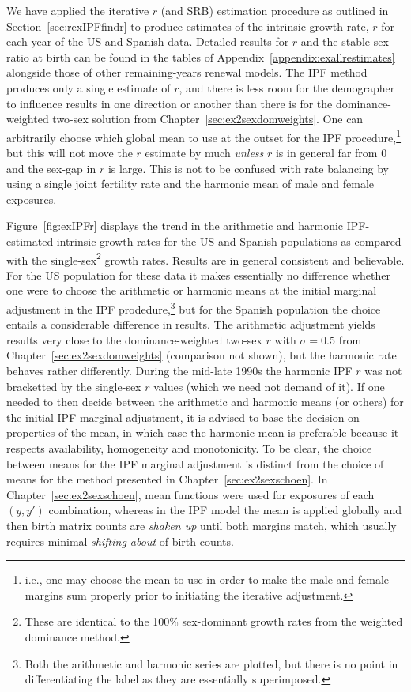 \FloatBarrier

We have applied the iterative $r$ (and SRB) estimation procedure as outlined in
Section~\ref{sec:rexIPFfindr} to produce estimates of the intrinsic growth rate,
$r$ for each year of the US and Spanish data. Detailed results for $r$ and
the stable sex ratio at birth can be found in the tables of
Appendix~\ref{appendix:exallrestimates} alongside those of other remaining-years 
renewal models. The IPF method produces only a single
estimate of $r$, and there is less room for the demographer to influence 
results in one direction or another than there is for the dominance-weighted 
two-sex solution from Chapter~\ref{sec:ex2sexdomweights}. One can
arbitrarily choose which global mean to use at the outset for the IPF
procedure,\footnote{i.e., one may choose the mean to use in order to make the
male and female margins sum properly prior to initiating the iterative adjustment.}
but this will not move the $r$ estimate by much \textit{unless} $r$ is in
general far from 0 and the sex-gap in $r$ is large. This is not to be confused
with rate balancing by using a single joint fertility rate and the harmonic 
mean of male and female exposures.

Figure~\ref{fig:exIPFr} displays the trend in the arithmetic and harmonic
IPF-estimated intrinsic growth rates for the US and Spanish populations as
compared with the single-sex\footnote{These are identical to the
100\% sex-dominant growth rates from the weighted dominance method.} growth
rates. Results are in general consistent and believable. For the US population 
for these data it makes essentially no difference whether one were to choose the
 arithmetic or harmonic means at the initial marginal adjustment in the IPF 
 prodedure,\footnote{Both the arithmetic
and harmonic series are plotted, but there is no point in differentiating the
label as they are essentially superimposed.} but for the Spanish population the
choice entails a considerable difference in results. The arithmetic
adjustment yields results very close to the dominance-weighted two-sex $r$ with
$\sigma = 0.5$ from Chapter~\ref{sec:ex2sexdomweights} (comparison not shown),
but the harmonic rate behaves rather differently. During the mid-late 1990s the
harmonic IPF $r$ was not bracketted by the single-sex $r$ values (which we
need not demand of it). If one needed to then decide between the arithmetic and
harmonic means (or others) for the initial IPF marginal adjustment, it is
advised to base the decision on properties of the mean, in which case the
harmonic mean is preferable because it respects availability, homogeneity and
monotonicity. To be clear, the choice between means for the IPF marginal
adjustment is distinct from the choice of means for the method presented in
Chapter~\ref{sec:ex2sexschoen}. In Chapter~\ref{sec:ex2sexschoen}, mean
functions were used for exposures of each $(y,y')$ combination, whereas in the
IPF model the mean is applied globally and then birth matrix counts are \textit{shaken up}
until both margins match, which usually requires minimal \textit{shifting about}
of birth counts.


